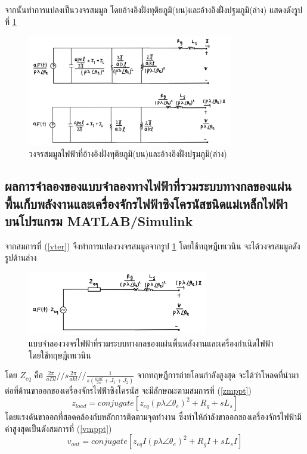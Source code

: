 \documentclass[11pt,a4paper]{article}
\begin{document}
จากนั้นทำการแปลงเป็นวงจรสมมูล โดยอ้างอิงฝั่งทุติยภูมิ(บน)และอ้างอิงฝั่งปฐมภูมิ(ล่าง) แสดงดังรูปที่ \ref{cir_mech_elec_3}
\begin{figure}[H]
    \begin{center}
        \includegraphics[width=0.8\textwidth]{cir_mech_elec_3.jpg}
    \end{center}
    \caption{วงจรสมมูลไฟฟ้าที่อ้างอิงฝั่งทุติยภูมิ(บน)และอ้างอิงฝั่งปฐมภูมิ(ล่าง)}
    \label{cir_mech_elec_3}
\end{figure}

\subsection{ผลการจำลองของแบบจำลองทางไฟฟ้าที่รวมระบบทางกลของแผ่นพื้นเก็บพลังงานและเครื่องจักรไฟฟ้าซิงโครนัสชนิดแม่เหล็กไฟฟ้า บนโปรแกรม MATLAB/Simulink}

จากสมการที่ (\ref{vter}) จึงทำการแปลงวงจรสมมูลจากรูป \ref{cir_mech_elec_3} โดยใช้ทฤษฎีเทเวนิน จะได้วงจรสมมูลดังรูปด้านล่าง
\begin{figure}[H]
    \begin{center}
        \includegraphics[width=0.7\textwidth]{cir_mech_elec_4.jpg}
    \end{center}
    \caption{แบบจำลองวงจรไฟฟ้าที่รวมระบบทางกลของแผ่นพื้นพลังงานและเครื่องกำเนิดไฟฟ้า โดยใช้ทฤษฎีเทเวนิน}
    \label{cir_mech_elec_4}
\end{figure}
โดย $Z_{eq}$ คือ $ \frac{2\pi}{aDl} // s \frac{2\pi }{akl} // \frac{1}{s( \frac{aml}{2\pi} + J_{1} + J_{2} ) }   $
จากทฤษฎีการถ่ายโอนกำลังสูงสุด จะได้ว่าโหลดที่นำมาต่อที่ด้านขาออกของเครื่องจักรไฟฟ้าซิงโครนัส จะมีลักษณะตามสมการที่ (\ref{zmppt})
\begin{equation}\label{zmppt}
    z_{load} = conjugate[ z_{eq} (p\lambda \angle \theta_{e})^2 + R_{g} + sL_{s} ]
\end{equation}
โดยแรงดันขาออกที่สอดคล้องกับหลักการติดตามจุดทำงาน ซึ่งทำให้กำลังขาออกของเครื่องจักรไฟฟ้ามีค่าสูงสุดเป็นดังสมการที่ (\ref{vmppt})
\begin{equation}\label{vmppt}
    v_{out} = conjugate[ z_{eq} I (p\lambda \angle \theta_{e})^2 + R_{g}I + sL_{s}I ]
\end{equation}
\end{document}
